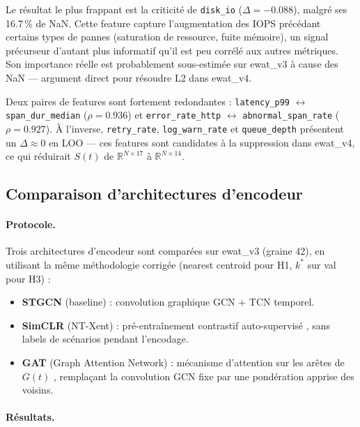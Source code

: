 Le résultat le plus frappant est la criticité de \texttt{disk\_io} ($\Delta = -0.088$),
malgré ses 16.7\,\% de NaN. Cette feature capture l'augmentation des IOPS précédant
certains types de pannes (saturation de ressource, fuite mémoire), un signal précurseur
d'autant plus informatif qu'il est peu corrélé aux autres métriques.
Son importance réelle est probablement sous-estimée sur ewat\_v3 à cause des NaN
--- argument direct pour résoudre L2 dans ewat\_v4.

Deux paires de features sont fortement redondantes :
\texttt{latency\_p99} $\leftrightarrow$ \texttt{span\_dur\_median} ($\rho = 0.936$) et
\texttt{error\_rate\_http} $\leftrightarrow$ \texttt{abnormal\_span\_rate} ($\rho = 0.927$).
À l'inverse, \texttt{retry\_rate}, \texttt{log\_warn\_rate} et \texttt{queue\_depth}
présentent un $\Delta \approx 0$ en LOO --- ces features sont candidates à la suppression
dans ewat\_v4, ce qui réduirait $S(t)$ de $\mathbb{R}^{N \times 17}$
à $\mathbb{R}^{N \times 14}$.

\subsection{Comparaison d'architectures d'encodeur}
\label{sec:architectures}

\paragraph{Protocole.}
Trois architectures d'encodeur sont comparées sur ewat\_v3 (graine 42), en utilisant
la même méthodologie corrigée (nearest centroid pour H1, $k^*$ sur val pour H3) :
\begin{itemize}
  \item \textbf{STGCN} (baseline) : convolution graphique GCN + TCN temporel.
  \item \textbf{SimCLR} (NT-Xent) : pré-entraînement contrastif auto-supervisé
    \cite{chen2020simclr}, sans labels de scénarios pendant l'encodage.
  \item \textbf{GAT} (Graph Attention Network) : mécanisme d'attention sur les arêtes
    de $G(t)$ \cite{velivckovic2018}, remplaçant la convolution GCN fixe par une
    pondération apprise des voisins.
\end{itemize}

\paragraph{Résultats.}

